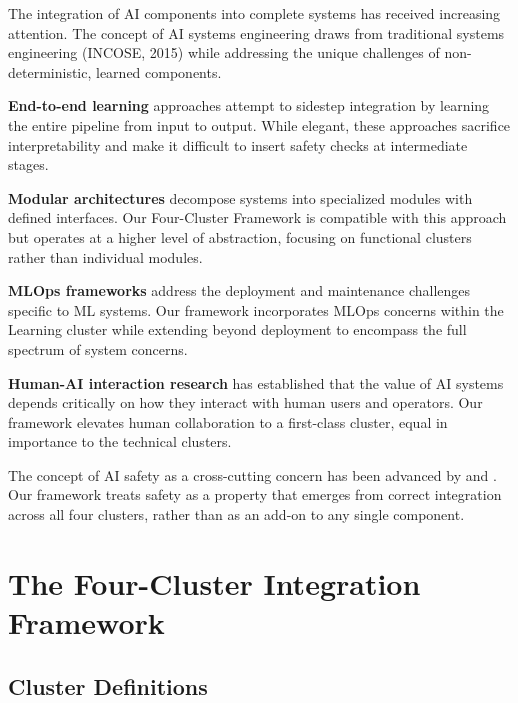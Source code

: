 \documentclass[11pt,a4paper]{article}
\begin{document}
The integration of AI components into complete systems has received increasing attention. The concept of AI systems engineering draws from traditional systems engineering (INCOSE, 2015) while addressing the unique challenges of non-deterministic, learned components.

\textbf{End-to-end learning} approaches \citep{levine2016,dosovitskiy2020} attempt to sidestep integration by learning the entire pipeline from input to output. While elegant, these approaches sacrifice interpretability and make it difficult to insert safety checks at intermediate stages.

\textbf{Modular architectures} \citep{andreas2016,gupta2023} decompose systems into specialized modules with defined interfaces. Our Four-Cluster Framework is compatible with this approach but operates at a higher level of abstraction, focusing on functional clusters rather than individual modules.

\textbf{MLOps frameworks} \citep{sculley2015,amershi2019} address the deployment and maintenance challenges specific to ML systems. Our framework incorporates MLOps concerns within the Learning cluster while extending beyond deployment to encompass the full spectrum of system concerns.

\textbf{Human-AI interaction research} \citep{amershi2019,bansal2019} has established that the value of AI systems depends critically on how they interact with human users and operators. Our framework elevates human collaboration to a first-class cluster, equal in importance to the technical clusters.

The concept of AI safety as a cross-cutting concern has been advanced by \citet{amodei2016} and \citet{hendrycks2021}. Our framework treats safety as a property that emerges from correct integration across all four clusters, rather than as an add-on to any single component.

\section{The Four-Cluster Integration Framework}

\subsection{Cluster Definitions}
\end{document}
